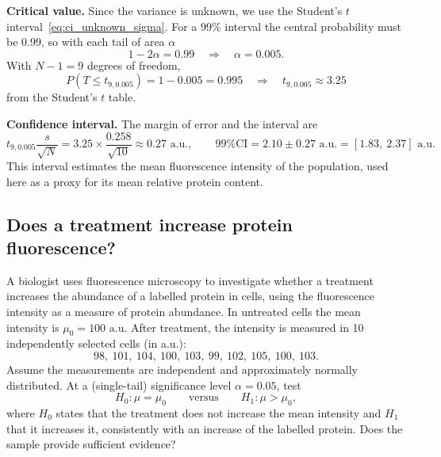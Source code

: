 \textbf{Critical value.} Since the variance is unknown, we use the Student's $t$ interval~\eqref{eq:ci_unknown_sigma}. For a 99\% interval the central probability must be 0.99, so with each tail of area $\alpha$
\begin{equation*}
1 - 2\alpha = 0.99 \quad \Longrightarrow \quad \alpha = 0.005.
\end{equation*}
With $N - 1 = 9$ degrees of freedom,
\begin{equation*}
P(T \le t_{9,0.005}) = 1 - 0.005 = 0.995 \quad \Longrightarrow \quad t_{9,0.005} \approx 3.25
\end{equation*}
from the Student's $t$ table.

\textbf{Confidence interval.} The margin of error and the interval are
\begin{equation*}
t_{9,0.005}\frac{s}{\sqrt{N}} = 3.25 \times \frac{0.258}{\sqrt{10}} \approx 0.27\text{ a.u.}, \qquad \text{99\% CI} = 2.10 \pm 0.27\text{ a.u.} = [1.83,\ 2.37]\text{ a.u.}
\end{equation*}
This interval estimates the mean fluorescence intensity of the population, used here as a proxy for its mean relative protein content.

\subsection{Does a treatment increase protein fluorescence?}
\label{ex:protein_test}

A biologist uses fluorescence microscopy to investigate whether a treatment increases the abundance of a labelled protein in cells, using the fluorescence intensity as a measure of protein abundance. In untreated cells the mean intensity is $\mu_0 = 100\text{ a.u.}$ After treatment, the intensity is measured in 10 independently selected cells (in a.u.):
\begin{equation*}
98,\ 101,\ 104,\ 100,\ 103,\ 99,\ 102,\ 105,\ 100,\ 103.
\end{equation*}
Assume the measurements are independent and approximately normally distributed. At a (single-tail) significance level $\alpha = 0.05$, test
\begin{equation*}
H_0\colon \mu = \mu_0 \qquad \text{versus} \qquad H_1\colon \mu > \mu_0,
\end{equation*}
where $H_0$ states that the treatment does not increase the mean intensity and $H_1$ that it increases it, consistently with an increase of the labelled protein. Does the sample provide sufficient evidence?

